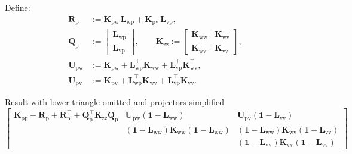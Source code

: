 Define:
\[
\begin{aligned}
\mathbf{R}_{\mathrm{p}} &:= \mathbf{K}_{\mathrm{pw}}\,\mathbf{L}_{\mathrm{wp}}
                         + \mathbf{K}_{\mathrm{pv}}\,\mathbf{L}_{\mathrm{vp}},\\[2pt]
\mathbf{Q}_{\mathrm{p}} &:= \begin{bmatrix}\mathbf{L}_{\mathrm{wp}}\\[2pt]\mathbf{L}_{\mathrm{vp}}\end{bmatrix},\qquad
\mathbf{K}_{\mathrm{zz}} := \begin{bmatrix}
\mathbf{K}_{\mathrm{ww}} & \mathbf{K}_{\mathrm{wv}}\\[2pt]
\mathbf{K}_{\mathrm{wv}}^{\top} & \mathbf{K}_{\mathrm{vv}}
\end{bmatrix},\\[4pt]
\mathbf{U}_{\mathrm{pw}} &:= \mathbf{K}_{\mathrm{pw}}
+ \mathbf{L}_{\mathrm{wp}}^{\top}\mathbf{K}_{\mathrm{ww}}
+ \mathbf{L}_{\mathrm{vp}}^{\top}\mathbf{K}_{\mathrm{wv}}^{\top},\\[2pt]
\mathbf{U}_{\mathrm{pv}} &:= \mathbf{K}_{\mathrm{pv}}
+ \mathbf{L}_{\mathrm{wp}}^{\top}\mathbf{K}_{\mathrm{wv}}
+ \mathbf{L}_{\mathrm{vp}}^{\top}\mathbf{K}_{\mathrm{vv}}.
\end{aligned}
\]

Result with lower triangle omitted and projectors simplified
\[
\left[
\begin{array}{ccc}
\mathbf{K}_{\mathrm{pp}}
+ \mathbf{R}_{\mathrm{p}} + \mathbf{R}_{\mathrm{p}}^{\top}
+ \mathbf{Q}_{\mathrm{p}}^{\top}\mathbf{K}_{\mathrm{zz}}\mathbf{Q}_{\mathrm{p}}
&
\mathbf{U}_{\mathrm{pw}}\left(\mathbf{1}-\mathbf{L}_{\mathrm{ww}}\right)
&
\mathbf{U}_{\mathrm{pv}}\left(\mathbf{1}-\mathbf{L}_{\mathrm{vv}}\right)
\\[8pt]
&
\left(\mathbf{1}-\mathbf{L}_{\mathrm{ww}}\right)\mathbf{K}_{\mathrm{ww}}\left(\mathbf{1}-\mathbf{L}_{\mathrm{ww}}\right)
&
\left(\mathbf{1}-\mathbf{L}_{\mathrm{ww}}\right)\mathbf{K}_{\mathrm{wv}}\left(\mathbf{1}-\mathbf{L}_{\mathrm{vv}}\right)
\\[8pt]
&
&
\left(\mathbf{1}-\mathbf{L}_{\mathrm{vv}}\right)\mathbf{K}_{\mathrm{vv}}\left(\mathbf{1}-\mathbf{L}_{\mathrm{vv}}\right)
\end{array}
\right]
\]


